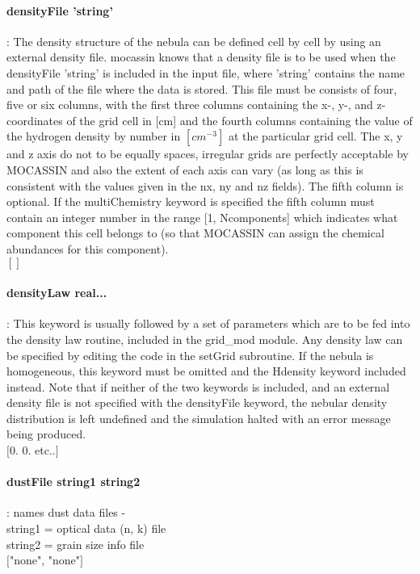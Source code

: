 \documentclass[11pt]{article}
\begin{document}
\paragraph   {densityFile 'string'}: The density structure of the nebula can be defined cell by 
	             cell by using an external density file. {\sc mocassin} knows that a 
		     density file is to be used when the densityFile 'string' is 
		     included in the input file, where 'string' contains the name 
		     and path of the file where the data is stored. This file must 
		     be consists of four, five or six columns, with the first three 
		     columns containing the x-, y-, and z- coordinates of the grid cell in 
		     [cm] and the fourth columns containing the value of the hydrogen 
		     density by number in $[cm^{-3}]$ at the particular grid cell. The 
		     x, y and z axis do not to be equally spaces, irregular grids are 
		     perfectly acceptable by MOCASSIN and also the extent of each axis 
		     can vary (as long as this is consistent with the values given in 
		     the nx, ny and nz fields). The fifth column is optional. If the 
                     multiChemistry keyword is specified the fifth column must contain
                     an integer number in the range [1, Ncomponents] which indicates what 
                     component this cell belongs to (so that MOCASSIN can assign the chemical 
                     abundances for this component).\\
		     $[]$\\

\paragraph    {densityLaw real... }: This keyword is usually followed by a set of 
		     parameters which are to be fed into the density law routine, 
		     included in the grid\_mod module. Any density law can be 
		     specified by editing the code in the setGrid subroutine. 
		     If the nebula is homogeneous, this keyword must be omitted 
		     and the Hdensity keyword included instead. Note that if neither
		     of the two keywords is included, and an external density file 
		     is not specified with the densityFile keyword, the nebular 
		     density distribution is left undefined and the simulation 
		     halted with an error message being produced.\\
		     $[$0. 0. etc..$]$\\
    
\paragraph    {dustFile string1 string2} : names dust data files - \\
                     string1 = optical data (n, k)  file\\
                     string2 = grain size info file\\
		     $[$"none", "none"$]$\\
\end{document}
